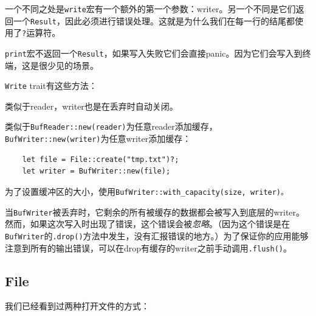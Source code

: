 一个不同之处是\texttt{write}宏有一个额外的第一个参数：writer。另一个不同是它们返回一个\texttt{Result}，因此必须进行错误处理。这就是为什么我们在每一行的结尾都使用了\texttt{?}运算符。

\texttt{print}宏不返回一个\texttt{Result}，如果写入失败它们会直接panic。因为它们会写入到终端，这是很少见的场景。

\texttt{Write} trait有这些方法：



类似于reader，writer也是在丢弃时自动关闭。

类似于\texttt{BufReader::new(reader)}为任意reader添加缓存，\texttt{BufWriter::new(writer)}为任意writer添加缓存：
\begin{verbatim}
    let file = File::create("tmp.txt")?;
    let writer = BufWriter::new(file);
\end{verbatim}

为了设置缓冲区的大小，使用\texttt{BufWriter::with\_capacity(size, writer)。}

当\texttt{BufWriter}被丢弃时，它剩余的所有被缓存的数据都会被写入到底层的writer。然而，如果这次写入时出现了错误，这个错误会被\emph{忽略}。（因为这个错误是在\texttt{BufWriter}的\texttt{.drop()}方法中发生，没有汇报错误的地方。）为了保证你的应用能够注意到所有的输出错误，可以在drop有缓存的writer之前手动调用\texttt{.flush()}。

\subsection{File}\label{file}
我们已经看到过两种打开文件的方式：



